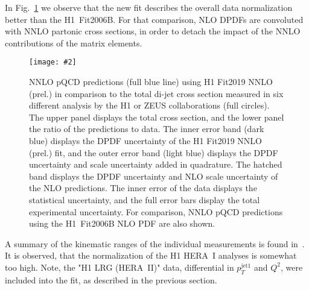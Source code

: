 \documentclass{PoS}
\newcommand{\includegraphicss}[2][]{\texttt{[image: \#2]}}
\begin{document}
In Fig.~\ref{figTotalXsecs} we observe that the new fit describes the overall data normalization better than the H1~Fit2006B. For that comparison, NLO DPDFs are convoluted with NNLO partonic cross sections, in order to detach the impact of the NNLO contributions of the matrix elements.
%
\begin{figure}[tbh]
\centering
\includegraphicss[trim={0cm 1.7cm 0 0.7cm},clip,width=.6\textwidth]{{{plots/H1prelim-19-013.fig3}}}
\caption{ NNLO pQCD predictions (full blue line) using H1 Fit2019 NNLO (prel.) in comparison to the total di-jet cross section measured in six different analysis by the H1 or ZEUS collaborations (full circles). The upper panel displays the total cross section, and the lower panel the ratio of the predictions to data. The inner error band (dark blue) displays the DPDF uncertainty of the H1 Fit2019 NNLO (prel.) fit, and the outer error band (light blue) displays the DPDF uncertainty and scale uncertainty added in quadrature. The hatched band displays the DPDF uncertainty and NLO scale uncertainty of the NLO predictions. The inner error of the data displays the statistical uncertainty, and the full error bars display the total experimental uncertainty. For comparison, NNLO pQCD predictions using the H1~Fit2006B NLO PDF are also shown.}
\label{figTotalXsecs}
\end{figure}
%
A summary of the kinematic ranges of the individual measurements is found in~\cite{Britzger:2018zvv}.
It is observed, that the normalization of the H1 HERA~I analyses is somewhat too high.
Note, the "H1 LRG (HERA~II)" data, differential in $p_T^{\mathrm{jet}1}$ and $Q^2$, were included into the fit, as described in the previous section.
\end{document}

